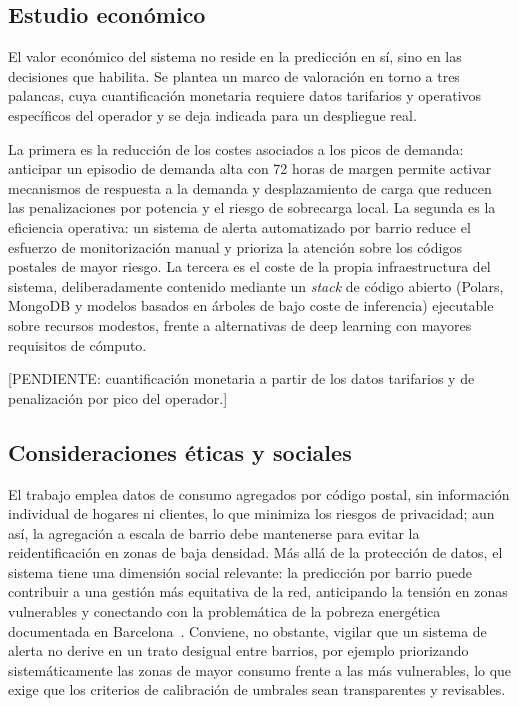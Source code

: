\documentclass[12pt, a4paper]{article}
\begin{document}
\subsection{Estudio económico}

El valor económico del sistema no reside en la predicción en sí, sino en las decisiones que habilita. Se plantea un marco de valoración en torno a tres palancas, cuya cuantificación monetaria requiere datos tarifarios y operativos específicos del operador y se deja indicada para un despliegue real.

La primera es la reducción de los costes asociados a los picos de demanda: anticipar un episodio de demanda alta con 72 horas de margen permite activar mecanismos de respuesta a la demanda y desplazamiento de carga que reducen las penalizaciones por potencia y el riesgo de sobrecarga local. La segunda es la eficiencia operativa: un sistema de alerta automatizado por barrio reduce el esfuerzo de monitorización manual y prioriza la atención sobre los códigos postales de mayor riesgo. La tercera es el coste de la propia infraestructura del sistema, deliberadamente contenido mediante un \textit{stack} de código abierto (Polars, MongoDB y modelos basados en árboles de bajo coste de inferencia) ejecutable sobre recursos modestos, frente a alternativas de deep learning con mayores requisitos de cómputo.

[PENDIENTE: cuantificación monetaria a partir de los datos tarifarios y de penalización por pico del operador.]

\subsection{Consideraciones éticas y sociales}

El trabajo emplea datos de consumo agregados por código postal, sin información individual de hogares ni clientes, lo que minimiza los riesgos de privacidad; aun así, la agregación a escala de barrio debe mantenerse para evitar la reidentificación en zonas de baja densidad. Más allá de la protección de datos, el sistema tiene una dimensión social relevante: la predicción por barrio puede contribuir a una gestión más equitativa de la red, anticipando la tensión en zonas vulnerables y conectando con la problemática de la pobreza energética documentada en Barcelona~\cite{maridelolmo2022}. Conviene, no obstante, vigilar que un sistema de alerta no derive en un trato desigual entre barrios, por ejemplo priorizando sistemáticamente las zonas de mayor consumo frente a las más vulnerables, lo que exige que los criterios de calibración de umbrales sean transparentes y revisables.
\end{document}
